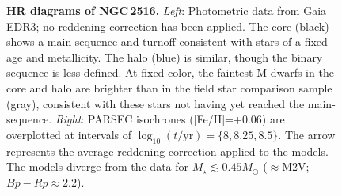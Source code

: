 \documentclass[12pt,twocolumn,tighten]{aastex63}
\begin{document}
\begin{figure}[t]
	\begin{center}
		\leavevmode
	\end{center}
	\vspace{-0.7cm}
  \caption{ {\bf HR diagrams of NGC\,2516.}
    {\it Left}: Photometric data from Gaia EDR3; no reddening correction
    has been applied.  The core (black) shows a main-sequence and
    turnoff consistent with stars of a fixed age and metallicity.  The
    halo (blue) is similar, though the binary sequence is less
    defined.  At fixed color, the faintest M dwarfs in the core and
    halo are brighter than in the field star comparison sample (gray),
    consistent with these stars not having yet reached the
    main-sequence.
    {\it Right}: PARSEC isochrones ([Fe/H]=+0.06) are overplotted
    at intervals of $\log_{10}(t/\mathrm{yr})=\{8, 8.25, 8.5\}$.
    The arrow represents the average reddening correction applied
    to the models.
     The models diverge
    from the data for $M_\star \lesssim 0.45M_\odot$ ($\approx$M2V;
    $Bp-Rp\approx2.2$).
    \label{fig:hr}
  }
\end{figure}
\end{document}
